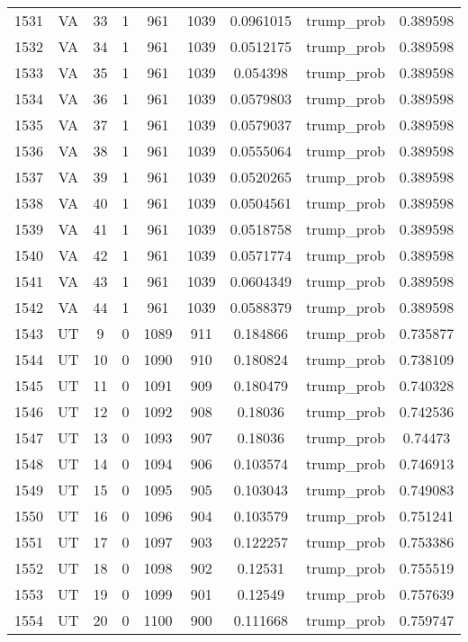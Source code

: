 \documentclass[12pt,a4paper]{article}
\begin{document}
\begin{tabular}{r|cccccccc}
	1531 & VA & 33 & 1 & 961 & 1039 & 0.0961015 & trump\_prob & 0.389598 \\
	1532 & VA & 34 & 1 & 961 & 1039 & 0.0512175 & trump\_prob & 0.389598 \\
	1533 & VA & 35 & 1 & 961 & 1039 & 0.054398 & trump\_prob & 0.389598 \\
	1534 & VA & 36 & 1 & 961 & 1039 & 0.0579803 & trump\_prob & 0.389598 \\
	1535 & VA & 37 & 1 & 961 & 1039 & 0.0579037 & trump\_prob & 0.389598 \\
	1536 & VA & 38 & 1 & 961 & 1039 & 0.0555064 & trump\_prob & 0.389598 \\
	1537 & VA & 39 & 1 & 961 & 1039 & 0.0520265 & trump\_prob & 0.389598 \\
	1538 & VA & 40 & 1 & 961 & 1039 & 0.0504561 & trump\_prob & 0.389598 \\
	1539 & VA & 41 & 1 & 961 & 1039 & 0.0518758 & trump\_prob & 0.389598 \\
	1540 & VA & 42 & 1 & 961 & 1039 & 0.0571774 & trump\_prob & 0.389598 \\
	1541 & VA & 43 & 1 & 961 & 1039 & 0.0604349 & trump\_prob & 0.389598 \\
	1542 & VA & 44 & 1 & 961 & 1039 & 0.0588379 & trump\_prob & 0.389598 \\
	1543 & UT & 9 & 0 & 1089 & 911 & 0.184866 & trump\_prob & 0.735877 \\
	1544 & UT & 10 & 0 & 1090 & 910 & 0.180824 & trump\_prob & 0.738109 \\
	1545 & UT & 11 & 0 & 1091 & 909 & 0.180479 & trump\_prob & 0.740328 \\
	1546 & UT & 12 & 0 & 1092 & 908 & 0.18036 & trump\_prob & 0.742536 \\
	1547 & UT & 13 & 0 & 1093 & 907 & 0.18036 & trump\_prob & 0.74473 \\
	1548 & UT & 14 & 0 & 1094 & 906 & 0.103574 & trump\_prob & 0.746913 \\
	1549 & UT & 15 & 0 & 1095 & 905 & 0.103043 & trump\_prob & 0.749083 \\
	1550 & UT & 16 & 0 & 1096 & 904 & 0.103579 & trump\_prob & 0.751241 \\
	1551 & UT & 17 & 0 & 1097 & 903 & 0.122257 & trump\_prob & 0.753386 \\
	1552 & UT & 18 & 0 & 1098 & 902 & 0.12531 & trump\_prob & 0.755519 \\
	1553 & UT & 19 & 0 & 1099 & 901 & 0.12549 & trump\_prob & 0.757639 \\
	1554 & UT & 20 & 0 & 1100 & 900 & 0.111668 & trump\_prob & 0.759747 \\

\end{tabular}
\end{document}
